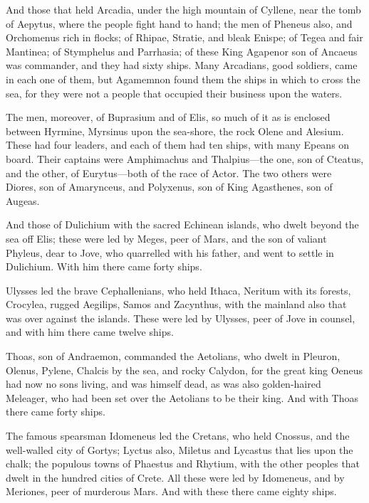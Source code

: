 And those that held Arcadia, under the high mountain of Cyllene, near the
tomb of Aepytus, where the people fight hand to hand; the men of Pheneus
also, and Orchomenus rich in flocks; of Rhipae, Stratie, and bleak Enispe;
of Tegea and fair Mantinea; of Stymphelus and Parrhasia; of these King
Agapenor son of Ancaeus was commander, and they had sixty ships. Many
Arcadians, good soldiers, came in each one of them, but Agamemnon found
them the ships in which to cross the sea, for they were not a people that
occupied their business upon the waters.

The men, moreover, of Buprasium and of Elis, so much of it as is enclosed
between Hyrmine, Myrsinus upon the sea-shore, the rock Olene and Alesium.
These had four leaders, and each of them had ten ships, with many Epeans
on board. Their captains were Amphimachus and Thalpius—the one, son
of Cteatus, and the other, of Eurytus—both of the race of Actor. The
two others were Diores, son of Amarynceus, and Polyxenus, son of King
Agasthenes, son of Augeas.

And those of Dulichium with the sacred Echinean islands, who dwelt beyond
the sea off Elis; these were led by Meges, peer of Mars, and the son of
valiant Phyleus, dear to Jove, who quarrelled with his father, and went to
settle in Dulichium. With him there came forty ships.

Ulysses led the brave Cephallenians, who held Ithaca, Neritum with its
forests, Crocylea, rugged Aegilips, Samos and Zacynthus, with the mainland
also that was over against the islands. These were led by Ulysses, peer of
Jove in counsel, and with him there came twelve ships.

Thoas, son of Andraemon, commanded the Aetolians, who dwelt in Pleuron,
Olenus, Pylene, Chalcis by the sea, and rocky Calydon, for the great king
Oeneus had now no sons living, and was himself dead, as was also
golden-haired Meleager, who had been set over the Aetolians to be their
king. And with Thoas there came forty ships.

The famous spearsman Idomeneus led the Cretans, who held Cnossus, and the
well-walled city of Gortys; Lyctus also, Miletus and Lycastus that lies
upon the chalk; the populous towns of Phaestus and Rhytium, with the other
peoples that dwelt in the hundred cities of Crete. All these were led by
Idomeneus, and by Meriones, peer of murderous Mars. And with these there
came eighty ships.


